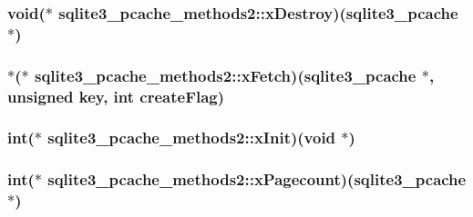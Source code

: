 \hypertarget{structsqlite3__pcache__methods2_a144d6e899889e80e00f93fb6c83359e2}{
\subsubsection[{x\-Destroy}]{\setlength{\rightskip}{0pt plus 5cm}void($\ast$ sqlite3\-\_\-pcache\-\_\-methods2\-::x\-Destroy)({\bf sqlite3\-\_\-pcache} $\ast$)}}\label{structsqlite3__pcache__methods2_a144d6e899889e80e00f93fb6c83359e2}
\hypertarget{structsqlite3__pcache__methods2_ac74dd2b35193a4309494311995da2d25}{
\subsubsection[{x\-Fetch}]{ $\ast$($\ast$ sqlite3\-\_\-pcache\-\_\-methods2\-::x\-Fetch)({\bf sqlite3\-\_\-pcache} $\ast$, unsigned key, int create\-Flag)}}\label{structsqlite3__pcache__methods2_ac74dd2b35193a4309494311995da2d25}
\hypertarget{structsqlite3__pcache__methods2_a8f77114458576c9d75cd53822fcd3462}{
\subsubsection[{x\-Init}]{\setlength{\rightskip}{0pt plus 5cm}int($\ast$ sqlite3\-\_\-pcache\-\_\-methods2\-::x\-Init)(void $\ast$)}}\label{structsqlite3__pcache__methods2_a8f77114458576c9d75cd53822fcd3462}
\hypertarget{structsqlite3__pcache__methods2_a5d51aba3927db1da9acf31fbdf7d57b5}{
\subsubsection[{x\-Pagecount}]{\setlength{\rightskip}{0pt plus 5cm}int($\ast$ sqlite3\-\_\-pcache\-\_\-methods2\-::x\-Pagecount)({\bf sqlite3\-\_\-pcache} $\ast$)}}\label{structsqlite3__pcache__methods2_a5d51aba3927db1da9acf31fbdf7d57b5}
